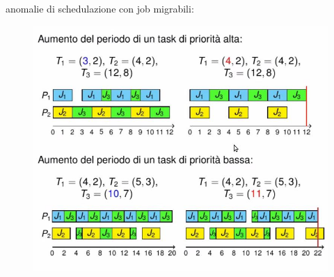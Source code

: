 \documentclass[12pt, oneside]{extbook}
\begin{document}
anomalie di schedulazione con job migrabili:\\
\begin{figure}[!h]
\centering
\includegraphics[scale=0.4]{immagini/image-040.jpg}
\end{figure}
\end{document}

